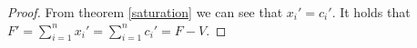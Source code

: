 \begin{proof}
    From theorem \ref{saturation} we can see that $x_i' = c_i'$. It holds that $F' = \sum\limits_{i=1}^nx_i' =
    \sum\limits_{i=1}^nc_i' = F - V$.
\end{proof}
